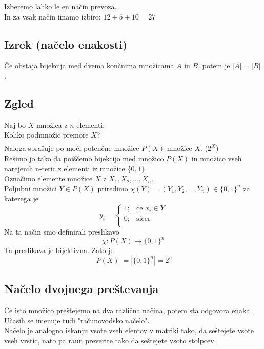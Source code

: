 \noindent
Izberemo lahko le en način prevoza. \\
In za vsak način imamo izbiro: $12 + 5 + 10 = 27$



\subsection{Izrek (načelo enakosti)}
Če obstaja bijekcija med dvema končnima množicama $A$ in $B$, potem je $|A| = |B|$.


\subsection{Zgled}
Naj bo $X$ množica z $n$ elementi: \\
Koliko podmnožic premore $X$?
\begin{align*}
\end{align*}
Naloga sprašuje po moči potenčne množice $P(X)$ množice $X$. ($2^X$) \\
\noindent
Rešimo jo tako da poiščemo bijekcijo med množico $P(X)$ in množico vseh narejenih n-teric z elementi iz množice $\{0, 1\}$ \\
\noindent
Označimo elemente množice $X$ z $X_1, X_2, \dots, X_n$. \\
\noindent
Poljubni množici $Y \in P(X)$ priredimo $\chi(Y) = (Y_1, Y_2, \dots, Y_n) \in \{0, 1\}^n$ za katerega je
$$
y_i = 
\begin{cases}
    1; & \text{če } x_i \in Y \\
    0; & \text{sicer } \\
\end{cases}
$$  
Na ta način smo definirali preslikavo 
$$
\chi : P(X) \to \{0, 1\}^n
$$
Ta preslikava je bijektivna. Zato je
$$
|P(X)| = |\{0, 1\}^n| = 2^n
$$




\subsection{Načelo dvojnega preštevanja}
Če isto množico preštejemo na dva različna načina, potem sta odgovora enaka. \\

\noindent
Učasih se imenuje tudi "računovodsko načelo". \\

\noindent
Načelo je analogno iskanju vsote vseh elentov v matriki tako, da seštejete vsote vseh vrstic, nato pa raun preverite tako da seštejete vsoto stolpcev.

